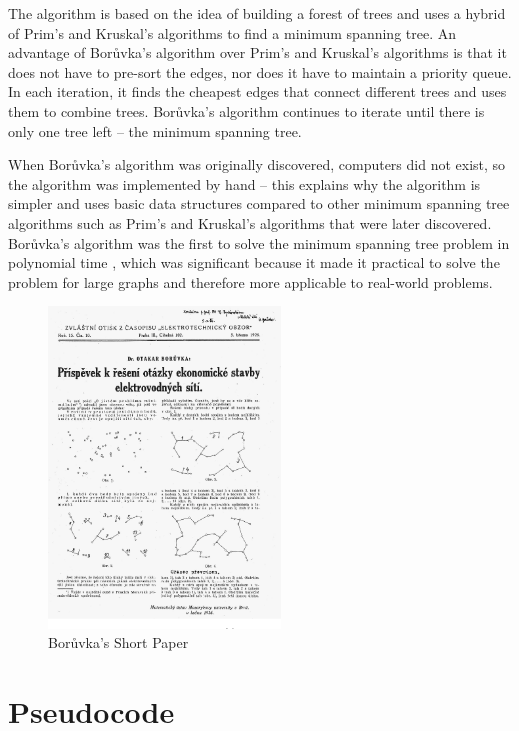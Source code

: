 \documentclass[a4paper, 11pt]{article}
\begin{document}
The algorithm is based on the idea of building a forest of trees and uses a hybrid of Prim's and Kruskal's algorithms to find a minimum spanning tree. An advantage of Borůvka's algorithm over Prim's and Kruskal's algorithms is that it does not have to pre-sort the edges, nor does it have to maintain a priority queue. In each iteration, it finds the cheapest edges that connect different trees and uses them to combine trees. Borůvka's algorithm continues to iterate until there is only one tree left -- the minimum spanning tree.

When Borůvka's algorithm was originally discovered, computers did not exist, so the algorithm was implemented by hand -- this explains why the algorithm is simpler and uses basic data structures compared to other minimum spanning tree algorithms such as Prim's and Kruskal's algorithms that were later discovered. Borůvka's algorithm was the first to solve the minimum spanning tree problem in polynomial time \cite{deterministicMSTs}, which was significant because it made it practical to solve the problem for large graphs and therefore more applicable to real-world problems. 

\begin{figure}[h]
    \caption{Borůvka's Short Paper \cite{nevsetvril2001otakar}}
    \begin{center}
        \includegraphics[width=0.55\textwidth]{Boruvka's Short Paper.png}
    \end{center}
\end{figure}

\section{Pseudocode}
\end{document}
